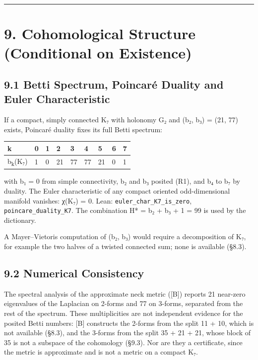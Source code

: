 \documentclass[11pt,a4paper]{article}
\begin{document}
\begin{center}\rule{\linewidth}{0.5pt}\end{center}

\section{9. Cohomological Structure (Conditional on Existence)}\label{cohomological-structure-conditional-on-existence}

\subsection{9.1 Betti Spectrum, Poincaré Duality and Euler Characteristic}\label{betti-spectrum-poincaruxe9-duality-and-euler-characteristic}

If a compact, simply connected K₇ with holonomy G₂ and (b₂, b₃) = (21, 77) exists, Poincaré duality fixes its full Betti spectrum:

\begin{longtable}[]{@{}lllllllll@{}}
\toprule\noalign{}
k & 0 & 1 & 2 & 3 & 4 & 5 & 6 & 7 \\
\midrule\noalign{}
\endhead
\bottomrule\noalign{}
\endlastfoot
b\textsubscript{k}(K₇) & 1 & 0 & 21 & 77 & 77 & 21 & 0 & 1 \\
\end{longtable}

with b₁ = 0 from simple connectivity, b₂ and b₃ posited (R1), and b₄ to b₇ by duality. The Euler characteristic of any compact oriented odd-dimensional manifold vanishes: χ(K₇) = 0. Lean: \texttt{euler\_\allowbreak{}char\_\allowbreak{}K7\_\allowbreak{}is\_\allowbreak{}zero}, \texttt{poincare\_\allowbreak{}duality\_\allowbreak{}K7}. The combination H* = b₂ + b₃ + 1 = 99 is used by the dictionary.

A Mayer--Vietoris computation of (b₂, b₃) would require a decomposition of K₇, for example the two halves of a twisted connected sum; none is available (§8.3).

\subsection{9.2 Numerical Consistency}\label{numerical-consistency}

The spectral analysis of the approximate neck metric ({[}B{]}) reports 21 near-zero eigenvalues of the Laplacian on 2-forms and 77 on 3-forms, separated from the rest of the spectrum. These multiplicities are not independent evidence for the posited Betti numbers: {[}B{]} constructs the 2-forms from the split 11 + 10, which is not available (§8.3), and the 3-forms from the split 35 + 21 + 21, whose block of 35 is not a subspace of the cohomology (§9.3). Nor are they a certificate, since the metric is approximate and is not a metric on a compact K₇.
\end{document}
